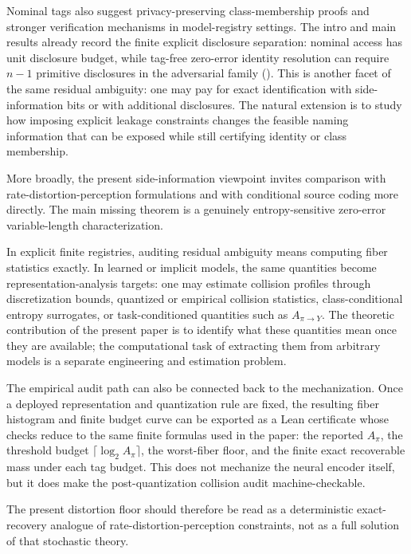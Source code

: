Nominal tags also suggest privacy-preserving class-membership proofs and stronger verification mechanisms in model-registry settings. The intro and main results already record the finite explicit disclosure separation: nominal access has unit disclosure budget, while tag-free zero-error identity resolution can require $n-1$ primitive disclosures in the adversarial family (). This is another facet of the same residual ambiguity: one may pay for exact identification with side-information bits or with additional disclosures. The natural extension is to study how imposing explicit leakage constraints changes the feasible naming information that can be exposed while still certifying identity or class membership.

More broadly, the present side-information viewpoint invites comparison with rate-distortion-perception formulations \cite{blau2019rethinking} and with conditional source coding more directly. The main missing theorem is a genuinely entropy-sensitive zero-error variable-length characterization.

In explicit finite registries, auditing residual ambiguity means computing fiber statistics exactly. In learned or implicit models, the same quantities become representation-analysis targets: one may estimate collision profiles through discretization bounds, quantized or empirical collision statistics, class-conditional entropy surrogates, or task-conditioned quantities such as $A_{\pi \to Y}$. The theoretic contribution of the present paper is to identify what these quantities mean once they are available; the computational task of extracting them from arbitrary models is a separate engineering and estimation problem.

The empirical audit path can also be connected back to the mechanization. Once a deployed representation and quantization rule are fixed, the resulting fiber histogram and finite budget curve can be exported as a Lean certificate whose checks reduce to the same finite formulas used in the paper: the reported $A_\pi$, the threshold budget $\lceil \log_2 A_\pi \rceil$, the worst-fiber floor, and the finite exact recoverable mass under each tag budget. This does not mechanize the neural encoder itself, but it does make the post-quantization collision audit machine-checkable.

The present distortion floor should therefore be read as a deterministic exact-recovery analogue of rate-distortion-perception constraints, not as a full solution of that stochastic theory.

